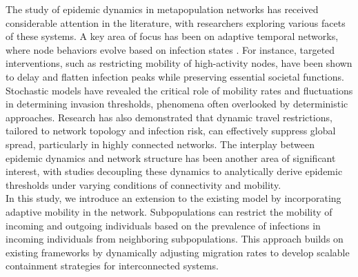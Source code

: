 The study of epidemic dynamics in metapopulation networks has received considerable attention in the literature, with researchers exploring various facets of these systems. A key area of focus has been on adaptive temporal networks, where node behaviors evolve based on infection states%
. For instance, targeted interventions, such as restricting mobility of high-activity nodes, have been shown to delay and flatten infection peaks while preserving essential societal functions\cite{mancastroppa2024preserving}. Stochastic models have revealed the critical role of mobility rates and fluctuations in determining invasion thresholds, phenomena often overlooked by deterministic approaches\cite{matamalas2018effecftive}. Research has also demonstrated that dynamic travel restrictions, tailored to network topology and infection risk, can effectively suppress global spread, particularly in highly connected networks\cite{hufnagel2004forecast}. The interplay between epidemic dynamics and network structure has been another area of significant interest, with studies decoupling these dynamics to analytically derive epidemic thresholds under varying conditions of connectivity and mobility\cite{kuehn2022influence}.\\

In this study, we introduce an extension to the existing model %
 by incorporating adaptive mobility in the network. Subpopulations can restrict the mobility of incoming and outgoing individuals based on the prevalence of infections in incoming individuals from neighboring subpopulations. This approach builds on existing frameworks by dynamically adjusting migration rates to develop scalable containment strategies for interconnected systems.

% 